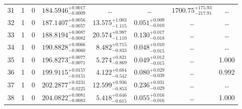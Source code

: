 \begin{table*}[!]
\begin{tabular}{llcrrlrc}
31 & 1 & 0 & $    184.5946_{-      0.0009}^{+      0.0017}$ & \multicolumn{1}{c}{\dots} & \multicolumn{1}{c}{\dots} & $     1700.75_{-      217.91}^{+      175.93}$ & \dots \\[1pt]
32 & 1 & 0 & $    187.1407_{-      0.0057}^{+      0.0056}$ & $      13.575_{-       1.115}^{+       1.003}$ & $       0.051_{-       0.010}^{+       0.009}$ & \multicolumn{1}{c}{\dots} & \dots \\[1pt]
33 & 1 & 0 & $    188.8194_{-      0.0082}^{+      0.0087}$ & $      20.574_{-       1.110}^{+       0.987}$ & $       0.130_{-       0.018}^{+       0.017}$ & \multicolumn{1}{c}{\dots} & \dots \\[1pt]
34 & 1 & 0 & $    190.8828_{-      0.0060}^{+      0.0066}$ & $       8.482_{-       0.833}^{+       0.715}$ & $       0.048_{-       0.015}^{+       0.010}$ & \multicolumn{1}{c}{\dots} & \dots \\[1pt]

35 & 1 & 0 & $    196.8273_{-      0.0071}^{+      0.0077}$ & $       5.274_{-       0.869}^{+       0.821}$ & $       0.049_{-       0.015}^{+       0.012}$ & \multicolumn{1}{c}{\dots} & 1.000\\[1pt]
36 & 1 & 0 & $    199.9115_{-      0.0151}^{+      0.0157}$ & $       4.122_{-       0.542}^{+       0.684}$ & $       0.080_{-       0.039}^{+       0.029}$ & \multicolumn{1}{c}{\dots} & 0.992\\[1pt]
37 & 1 & 0 & $    202.2877_{-      0.0225}^{+      0.0231}$ & $      12.599_{-       0.853}^{+       0.936}$ & $       0.236_{-       0.029}^{+       0.031}$ & \multicolumn{1}{c}{\dots} & \dots \\[1pt]
38 & 1 & 0 & $    204.0822_{-      0.0083}^{+      0.0081}$ & $       5.418_{-       0.615}^{+       0.646}$ & $       0.055_{-       0.016}^{+       0.016}$ & \multicolumn{1}{c}{\dots} & 1.000 \\[1pt]


\hline
\end{tabular}
\end{table*}




